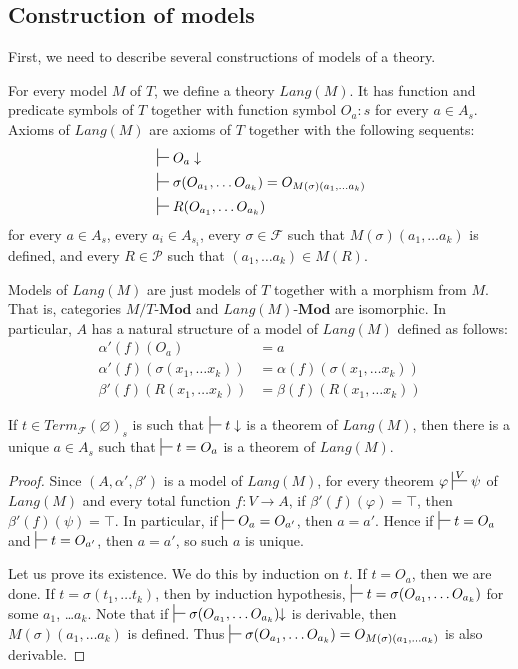 \documentclass{mscs}
\newcommand{\cat}[1]{\mathbf{#1}}
\newcommand{\Mod}[1]{#1\text{-}\cat{Mod}}
\numberwithin{figure}{section}
\begin{document}
\subsection{Construction of models}

First, we need to describe several constructions of models of a theory.

For every model $M$ of $T$, we define a theory $Lang(M)$.
It has function and predicate symbols of $T$ together with function symbol $O_a : s$ for every $a \in A_s$.
Axioms of $Lang(M)$ are axioms of $T$ together with the following sequents:
\begin{align*}
& \sststile{}{} O_a \downarrow \\
& \sststile{}{} \sigma(O_{a_1}, \ldots O_{a_k}) = O_{M(\sigma)(a_1, \ldots a_k)} \\
& \sststile{}{} R(O_{a_1}, \ldots O_{a_k})
\end{align*}
for every $a \in A_s$, every $a_i \in A_{s_i}$,
every $\sigma \in \mathcal{F}$ such that $M(\sigma)(a_1, \ldots a_k)$ is defined,
and every $R \in \mathcal{P}$ such that $(a_1, \ldots a_k) \in M(R)$.

Models of $Lang(M)$ are just models of $T$ together with a morphism from $M$.
That is, categories $M/\Mod{T}$ and $\Mod{Lang(M)}$ are isomorphic.
In particular, $A$ has a natural structure of a model of $Lang(M)$ defined as follows:
\begin{align*}
\alpha'(f)(O_a) & = a \\
\alpha'(f)(\sigma(x_1, \ldots x_k)) & = \alpha(f)(\sigma(x_1, \ldots x_k)) \\
\beta'(f)(R(x_1, \ldots x_k)) & = \beta(f)(R(x_1, \ldots x_k))
\end{align*}

\begin{lem}[cl-term]
If $t \in Term_\mathcal{F}(\varnothing)_s$ is such that $\sststile{}{} t \downarrow$ is a theorem of $Lang(M)$,
    then there is a unique $a \in A_s$ such that $\sststile{}{} t = O_a$ is a theorem of $Lang(M)$.
\end{lem}
\begin{proof}
Since $(A,\alpha',\beta')$ is a model of $Lang(M)$, for every theorem $\varphi \sststile{}{V} \psi$ of $Lang(M)$
    and every total function $f : V \to A$, if $\beta'(f)(\varphi) = \top$, then $\beta'(f)(\psi) = \top$.
In particular, if $\sststile{}{} O_a = O_{a'}$, then $a = a'$.
Hence if $\sststile{}{} t = O_a$ and $\sststile{}{} t = O_{a'}$, then $a = a'$, so such $a$ is unique.

Let us prove its existence.
We do this by induction on $t$.
If $t = O_a$, then we are done.
If $t = \sigma(t_1, \ldots t_k)$, then by induction hypothesis, $\sststile{}{} t = \sigma(O_{a_1}, \ldots O_{a_k})$ for some $a_1$, \ldots $a_k$.
Note that if $\sststile{}{} \sigma(O_{a_1}, \ldots O_{a_k})\!\!\downarrow$ is derivable, then $M(\sigma)(a_1, \ldots a_k)$ is defined.
Thus $\sststile{}{} \sigma(O_{a_1}, \ldots O_{a_k}) = O_{M(\sigma)(a_1, \ldots a_k)}$ is also derivable.
\end{proof}
\end{document}
